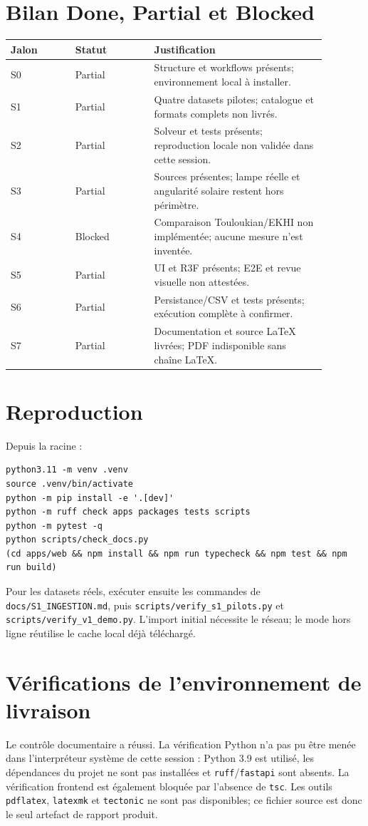 \documentclass[11pt,a4paper]{article}
\begin{document}
\section{Bilan Done, Partial et Blocked}
\begin{center}
\begin{tabular}{p{0.18\linewidth}p{0.22\linewidth}p{0.48\linewidth}}
\toprule
Jalon & Statut & Justification \\
\midrule
S0 & Partial & Structure et workflows présents; environnement local à installer.\\
S1 & Partial & Quatre datasets pilotes; catalogue et formats complets non livrés.\\
S2 & Partial & Solveur et tests présents; reproduction locale non validée dans cette session.\\
S3 & Partial & Sources présentes; lampe réelle et angularité solaire restent hors périmètre.\\
S4 & Blocked & Comparaison Touloukian/EKHI non implémentée; aucune mesure n'est inventée.\\
S5 & Partial & UI et R3F présents; E2E et revue visuelle non attestées.\\
S6 & Partial & Persistance/CSV et tests présents; exécution complète à confirmer.\\
S7 & Partial & Documentation et source LaTeX livrées; PDF indisponible sans chaîne LaTeX.\\
\bottomrule
\end{tabular}
\end{center}
\section{Reproduction}
Depuis la racine :
\begin{verbatim}
python3.11 -m venv .venv
source .venv/bin/activate
python -m pip install -e '.[dev]'
python -m ruff check apps packages tests scripts
python -m pytest -q
python scripts/check_docs.py
(cd apps/web && npm install && npm run typecheck && npm test && npm run build)
\end{verbatim}
Pour les datasets réels, exécuter ensuite les commandes de \texttt{docs/S1\_INGESTION.md}, puis \texttt{scripts/verify\_s1\_pilots.py} et \texttt{scripts/verify\_v1\_demo.py}. L'import initial nécessite le réseau; le mode hors ligne réutilise le cache local déjà téléchargé.
\section{Vérifications de l'environnement de livraison}
Le contrôle documentaire a réussi. La vérification Python n'a pas pu être menée dans l'interpréteur système de cette session : Python 3.9 est utilisé, les dépendances du projet ne sont pas installées et \texttt{ruff}/\texttt{fastapi} sont absents. La vérification frontend est également bloquée par l'absence de \texttt{tsc}. Les outils \texttt{pdflatex}, \texttt{latexmk} et \texttt{tectonic} ne sont pas disponibles; ce fichier source est donc le seul artefact de rapport produit.
\end{document}
